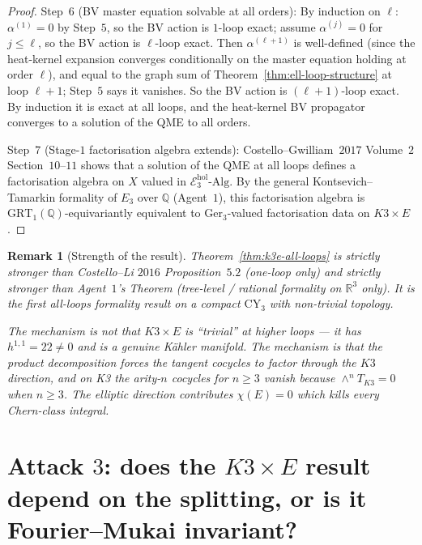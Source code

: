 \documentclass[11pt]{article}
\newtheorem{remark}[theorem]{Remark}
\providecommand{\CY}{\mathrm{CY}}
\providecommand{\RR}{\mathbb{R}}
\providecommand{\QQ}{\mathbb{Q}}
\providecommand{\GRT}{\mathrm{GRT}}
\begin{document}
\begin{proof}
Step~$6$ (BV master equation solvable at all orders):
By induction on $\ell$:  $\alpha^{(1)} = 0$ by Step~$5$, so the BV
action is $1$-loop exact;  assume $\alpha^{(j)} = 0$ for $j \leq \ell$,
so the BV action is $\ell$-loop exact.  Then
$\alpha^{(\ell+1)}$ is well-defined (since the heat-kernel
expansion converges conditionally on the master equation holding
at order $\ell$), and equal to the graph sum of
Theorem~\ref{thm:ell-loop-structure} at loop $\ell + 1$;  Step~$5$
says it vanishes.  So the BV action is $(\ell+1)$-loop exact.  By
induction it is exact at all loops, and the heat-kernel BV
propagator converges to a solution of the QME to all orders.

Step~$7$ (Stage-$1$ factorisation algebra extends):
Costello--Gwilliam~$2017$ Volume~$2$ Section~$10$--$11$ shows that
a solution of the QME at all loops defines a factorisation algebra
on $X$ valued in $\mathcal E_3^{\mathrm{hol}}\text{-}\mathrm{Alg}$.
By the general Kontsevich--Tamarkin formality of $E_3$ over $\QQ$
(Agent~$1$), this factorisation algebra is $\GRT_1(\QQ)$-equivariantly
equivalent to $\mathrm{Ger}_3$-valued factorisation data on
$K3 \times E$.
\end{proof}

\begin{remark}[Strength of the result]
\label{rem:k3e-strength}
Theorem~\ref{thm:k3e-all-loops} is strictly stronger than
Costello--Li $2016$ Proposition~$5.2$ (one-loop only) and strictly
stronger than Agent~$1$'s Theorem (tree-level / rational formality
on $\RR^3$ only).  It is the first all-loops formality result on a
compact $\CY_3$ with non-trivial topology.

The mechanism is \emph{not} that $K3 \times E$ is ``trivial'' at
higher loops --- it has $h^{1,1} = 22 \neq 0$ and is a genuine
K\"ahler manifold.  The mechanism is that the product decomposition
forces the tangent cocycles to factor through the $K3$ direction,
and on K3 the arity-$n$ cocycles for $n \geq 3$ vanish because
$\wedge^n T_{K3} = 0$ when $n \geq 3$.  The elliptic direction
contributes $\chi(E) = 0$ which kills every Chern-class integral.
\end{remark}

\section{Attack $3$:  does the $K3 \times E$ result depend on the
splitting, or is it Fourier--Mukai invariant?}
\label{sec:attack-3-fm-invariance}
\end{document}
